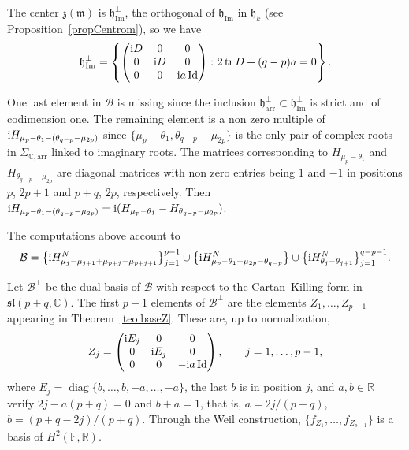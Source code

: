\documentclass[10pt,a4paper]{amsart}
\numberwithin{equation}{section}
\newcommand{\func}[1]{\operatorname{#1}}
\begin{document}
The center $\mathfrak{z }(\mathfrak{m })$ is $\mathfrak{h}_{\func{Im}}^{\bot}$, the orthogonal of $\mathfrak{h}_{\func{Im}}$ in $\mathfrak{h}_{k}$ (see Proposition~\ref{propCentrom}), so we have
\begin{gather*}
\mathfrak{h}_{\func{Im}}^{\bot }=\left\{\left(
\begin{matrix}
{\rm i}D & 0 & 0 \\
0 & {\rm i}D & 0 \\
0 & 0 & {\rm i}a\, \mathrm{Id}
\end{matrix}
\right)\colon 2\operatorname{tr}D+(q-p) a=0 \right\}.
\end{gather*}

One last element in $\mathcal{B}$ is missing since the inclusion $\mathfrak{h}_{\mathrm{arr}}^{\bot }\subset \mathfrak{h}_{\func{Im}}^{\bot }$ is strict and of codimension one. The remaining element is a non zero multiple of ${\rm i}H_{\mu_p-\theta_1-(\theta_{q-p}-\mu_{2p})}$ since $\{\mu_p-\theta_1,\theta_{q-p}-\mu_{2p}\}$ is the only pair of complex roots in $\Sigma_{\mathbb{C},\mathrm{arr}}$ linked to imaginary roots. The matrices corresponding to $H_{\mu_p-\theta_1}$ and $H_{\theta_{q-p}-\mu_{2p}}$ are diagonal matrices with non zero entries being $1$ and $-1$ in positions $p$, $2p+1$ and $p+q$, $2p$, respectively. Then ${\rm i}H_{\mu_p-\theta_1-(\theta_{q-p}-\mu_{2p})}={\rm i}(H_{\mu_p-\theta_1}-H_{\theta_{q-p}-\mu_{2p}})$.

The computations above account to
\begin{gather*}
\mathcal{B}= \big\{ {\rm i}H_{\mu_{j}-\mu _{j+1}+\mu _{p+j}-\mu _{p+j+1}}^N\big\}_{j=1}^{p-1} \cup\big\{{\rm i}H_{\mu_p-\theta_1+\mu_{2p}-\theta_{q-p}}^N\big\} \cup\big\{{\rm i}H_{\theta_j-\theta_{j+1}}^N\big\}_{j=1}^{q-p-1}.
\end{gather*}

Let $\mathcal{B}^{\bot }$ be the dual basis of $\mathcal{B}$ with respect to the Cartan--Killing form in $\mathfrak{sl}(p+q,\mathbb{C})$. The first $p-1$ elements of $\mathcal{B}^{\bot }$ are the elements $Z_{1},\ldots,Z_{p-1}$ appearing in Theorem~\ref{teo.baseZ}. These are, up to normalization,
\begin{gather*}
Z_{j}=\left(
\begin{matrix}
{\rm i}E_{j} & 0 & 0 \\
0 & {\rm i}E_{j} & 0 \\
0 & 0 & -{\rm i}a\func{Id}
\end{matrix}
\right), \qquad j=1,\ldots,p-1,
\end{gather*}%
where $E_{j}=\operatorname{diag}\{b,\ldots,b,-a,\ldots,-a\}$, the last $b$ is in position $j$, and $a,b\in \mathbb{R}$ verify $2j-a(p+q) =0$ and $b+a=1$, that is, $a=2j/(p+q)$, $b=(p+q-2j)/(p+q)$. Through the Weil construction, $\{f_{Z_{1}},\ldots,f_{Z_{p-1}}\}$ is a basis of $H^{2}(\mathbb{F},\mathbb{R})$.
\end{document}
